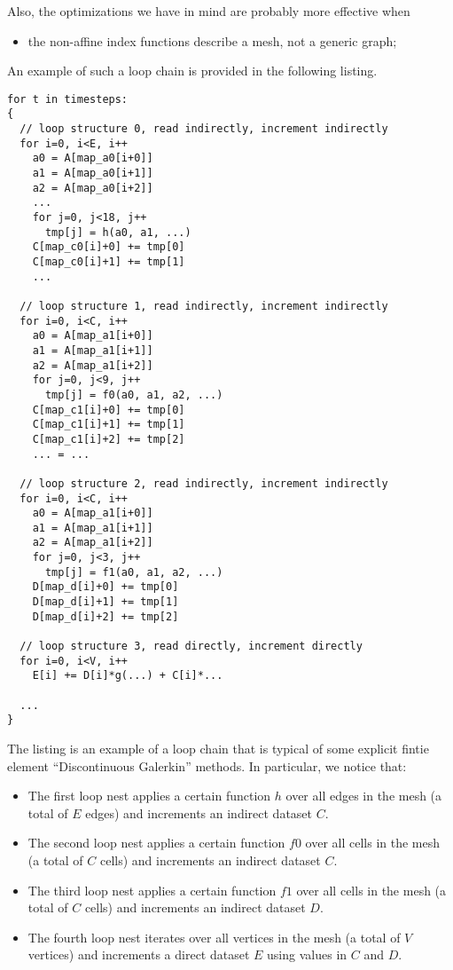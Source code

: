 \documentclass[a4paper]{article}
\begin{document}
Also, the optimizations we have in mind are probably more effective when
\begin{itemize}
\item the non-affine index functions describe a mesh, not a generic graph;
\end{itemize}
An example of such a loop chain is provided in the following listing.

\clearpage

\begin{footnotesize}
\begin{lstlisting}
for t in timesteps:
{
  // loop structure 0, read indirectly, increment indirectly
  for i=0, i<E, i++
    a0 = A[map_a0[i+0]]
    a1 = A[map_a0[i+1]]
    a2 = A[map_a0[i+2]]
    ...
    for j=0, j<18, j++
      tmp[j] = h(a0, a1, ...)
    C[map_c0[i]+0] += tmp[0]
    C[map_c0[i]+1] += tmp[1]
    ...

  // loop structure 1, read indirectly, increment indirectly
  for i=0, i<C, i++
    a0 = A[map_a1[i+0]]
    a1 = A[map_a1[i+1]]
    a2 = A[map_a1[i+2]]
    for j=0, j<9, j++
      tmp[j] = f0(a0, a1, a2, ...)
    C[map_c1[i]+0] += tmp[0]
    C[map_c1[i]+1] += tmp[1]
    C[map_c1[i]+2] += tmp[2]
    ... = ...

  // loop structure 2, read indirectly, increment indirectly
  for i=0, i<C, i++
    a0 = A[map_a1[i+0]]
    a1 = A[map_a1[i+1]]
    a2 = A[map_a1[i+2]]
    for j=0, j<3, j++
      tmp[j] = f1(a0, a1, a2, ...)
    D[map_d[i]+0] += tmp[0]
    D[map_d[i]+1] += tmp[1]
    D[map_d[i]+2] += tmp[2]
          
  // loop structure 3, read directly, increment directly
  for i=0, i<V, i++
    E[i] += D[i]*g(...) + C[i]*...

  ...
}
\end{lstlisting}
\end{footnotesize}

The listing is an example of a loop chain that is typical of some explicit fintie element ``Discontinuous Galerkin'' methods. In particular, we notice that:
\begin{itemize}
\item The first loop nest applies a certain function $h$ over all edges in the mesh (a total of $E$ edges) and increments an indirect dataset $C$.
\item The second loop nest applies a certain function $f0$ over all cells in the mesh (a total of $C$ cells) and increments an indirect dataset $C$.
\item The third loop nest applies a certain function $f1$ over all cells in the mesh (a total of $C$ cells) and increments an indirect dataset $D$.
\item The fourth loop nest iterates over all vertices in the mesh (a total of $V$ vertices) and increments a direct dataset $E$ using values in $C$ and $D$.
\end{itemize}
\end{document}
